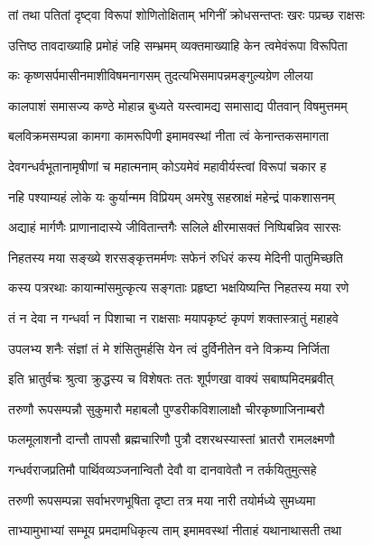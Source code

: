 
\twolineshloka
{तां तथा पतितां दृष्ट्वा विरूपां शोणितोक्षिताम्}
{भगिनीं क्रोधसन्तप्तः खरः पप्रच्छ राक्षसः} %

\twolineshloka
{उत्तिष्ठ तावदाख्याहि प्रमोहं जहि सम्भ्रमम्}
{व्यक्तमाख्याहि केन त्वमेवंरूपा विरूपिता} %

\twolineshloka
{कः कृष्णसर्पमासीनमाशीविषमनागसम्}
{तुदत्यभिसमापन्नमङ्गुल्यग्रेण लीलया} %

\twolineshloka
{कालपाशं समासज्य कण्ठे मोहान्न बुध्यते}
{यस्त्वामद्य समासाद्य पीतवान् विषमुत्तमम्} %

\twolineshloka
{बलविक्रमसम्पन्ना कामगा कामरूपिणी}
{इमामवस्थां नीता त्वं केनान्तकसमागता} %

\twolineshloka
{देवगन्धर्वभूतानामृषीणां च महात्मनाम्}
{कोऽयमेवं महावीर्यस्त्वां विरूपां चकार ह} %

\twolineshloka
{नहि पश्याम्यहं लोके यः कुर्यान्मम विप्रियम्}
{अमरेषु सहस्राक्षं महेन्द्रं पाकशासनम्} %

\twolineshloka
{अद्याहं मार्गणैः प्राणानादास्ये जीवितान्तगैः}
{सलिले क्षीरमासक्तं निष्पिबन्निव सारसः} %

\twolineshloka
{निहतस्य मया सङ्ख्ये शरसङ्कृत्तमर्मणः}
{सफेनं रुधिरं कस्य मेदिनी पातुमिच्छति} %

\twolineshloka
{कस्य पत्ररथाः कायान्मांसमुत्कृत्य सङ्गताः}
{प्रहृष्टा भक्षयिष्यन्ति निहतस्य मया रणे} %

\twolineshloka
{तं न देवा न गन्धर्वा न पिशाचा न राक्षसाः}
{मयापकृष्टं कृपणं शक्तास्त्रातुं महाहवे} %

\twolineshloka
{उपलभ्य शनैः संज्ञां तं मे शंसितुमर्हसि}
{येन त्वं दुर्विनीतेन वने विक्रम्य निर्जिता} %

\twolineshloka
{इति भ्रातुर्वचः श्रुत्वा क्रुद्धस्य च विशेषतः}
{ततः शूर्पणखा वाक्यं सबाष्पमिदमब्रवीत्} %

\twolineshloka
{तरुणौ रूपसम्पन्नौ सुकुमारौ महाबलौ}
{पुण्डरीकविशालाक्षौ चीरकृष्णाजिनाम्बरौ} %

\twolineshloka
{फलमूलाशनौ दान्तौ तापसौ ब्रह्मचारिणौ}
{पुत्रौ दशरथस्यास्तां भ्रातरौ रामलक्ष्मणौ} %

\twolineshloka
{गन्धर्वराजप्रतिमौ पार्थिवव्यञ्जनान्वितौ}
{देवौ वा दानवावेतौ न तर्कयितुमुत्सहे} %

\twolineshloka
{तरुणी रूपसम्पन्ना सर्वाभरणभूषिता}
{दृष्टा तत्र मया नारी तयोर्मध्ये सुमध्यमा} %

\twolineshloka
{ताभ्यामुभाभ्यां सम्भूय प्रमदामधिकृत्य ताम्}
{इमामवस्थां नीताहं यथानाथासती तथा} %

